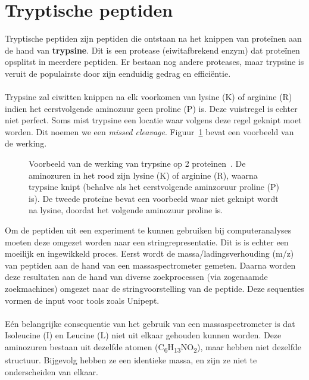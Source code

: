 \section{Tryptische peptiden}\label{sec:tryptische-peptiden}
Tryptische peptiden zijn peptiden die ontstaan na het knippen van proteïnen aan de hand van \textbf{trypsine}.
Dit is een protease (eiwitafbrekend enzym) dat proteïnen opsplitst in meerdere peptiden.
Er bestaan nog andere proteases, maar trypsine is veruit de populairste door zijn eenduidig gedrag en efficiëntie.
\\ \\
Trypsine zal eiwitten knippen na elk voorkomen van lysine (K) of arginine (R) indien het eerstvolgende aminozuur geen proline (P) is.
Deze vuistregel is echter niet perfect.
Soms mist trypsine een locatie waar volgens deze regel geknipt moet worden.
Dit noemen we een \textit{missed cleavage}.
Figuur~\ref{fig:trypsine} bevat een voorbeeld van de werking.

\begin{figure}[H]
    \centering
    
    \caption{Voorbeeld van de werking van trypsine op 2 proteïnen~\cite{phdPieterUnipept}. De aminozuren in het rood zijn lysine (K) of arginine (R), waarna trypsine knipt (behalve als het eerstvolgende aminzoruur proline (P) is). De tweede proteïne bevat een voorbeeld waar niet geknipt wordt na lysine, doordat het volgende aminozuur proline is.}
    \label{fig:trypsine}
\end{figure}

Om de peptiden uit een experiment te kunnen gebruiken bij computeranalyses moeten deze omgezet worden naar een stringrepresentatie.
Dit is is echter een moeilijk en ingewikkeld proces.
Eerst wordt de massa/ladingsverhouding (m/z) van peptiden aan de hand van een massaspectrometer gemeten.
Daarna worden deze resultaten aan de hand van diverse zoekprocessen (via zogenaamde zoekmachines) omgezet naar de stringvoorstelling van de peptide.
Deze sequenties vormen de input voor tools zoals Unipept.
\\ \\
Eén belangrijke consequentie van het gebruik van een massaspectrometer is dat Isoleucine (I) en Leucine (L) niet uit elkaar gehouden kunnen worden.
Deze aminozuren bestaan uit dezelfde atomen (C\textsubscript{6}H\textsubscript{13}NO\textsubscript{2}), maar hebben niet dezelfde structuur.
Bijgevolg hebben ze een identieke massa, en zijn ze niet te onderscheiden van elkaar.


